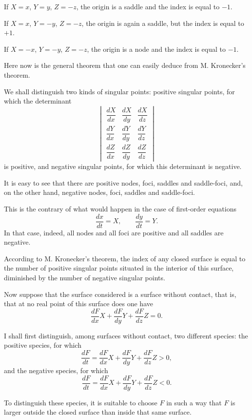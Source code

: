 \documentclass[11pt]{article}
\begin{document}
If $X=x$, $Y=y$, $Z=-z$, the origin is a saddle and the index is equal to $-1$.

If $X=x$, $Y=-y$, $Z=-z$, the origin is again a saddle, but the index is equal to $+1$.

If $X=-x$, $Y=-y$, $Z=-z$, the origin is a node and the index is equal to $-1$.

Here now is the general theorem that one can easily deduce from M. Kronecker’s theorem.

We shall distinguish two kinds of singular points: positive singular points, for which the determinant
\begin{equation}
\begin{vmatrix}
\dfrac{dX}{dx}&\dfrac{dX}{dy}&\dfrac{dX}{dz}\\
\dfrac{dY}{dx}&\dfrac{dY}{dy}&\dfrac{dY}{dz}\\
\dfrac{dZ}{dx}&\dfrac{dZ}{dy}&\dfrac{dZ}{dz}
\end{vmatrix}
\tag{1}
\end{equation}
is positive, and negative singular points, for which this determinant is negative.

It is easy to see that there are positive nodes, foci, saddles and saddle-foci, and, on the other hand, negative nodes, foci, saddles and saddle-foci.

This is the contrary of what would happen in the case of first-order equations
\[
\frac{dx}{dt}=X,
\qquad
\frac{dy}{dt}=Y.
\]
In that case, indeed, all nodes and all foci are positive and all saddles are negative.

According to M. Kronecker’s theorem, the index of any closed surface is equal to the number of positive singular points situated in the interior of this surface, diminished by the number of negative singular points.

Now suppose that the surface considered is a surface without contact, that is, that at no real point of this surface does one have
\[
\frac{dF}{dx}X+\frac{dF}{dy}Y+\frac{dF}{dz}Z=0.
\]

I shall first distinguish, among surfaces without contact, two different species: the positive species, for which
\[
\frac{dF}{dt}=\frac{dF}{dx}X+\frac{dF}{dy}Y+\frac{dF}{dz}Z>0,
\]
and the negative species, for which
\[
\frac{dF}{dt}=\frac{dF}{dx}X+\frac{dF}{dy}Y+\frac{dF}{dz}Z<0.
\]

To distinguish these species, it is suitable to choose $F$ in such a way that $F$ is larger outside the closed surface than inside that same surface.
\end{document}
